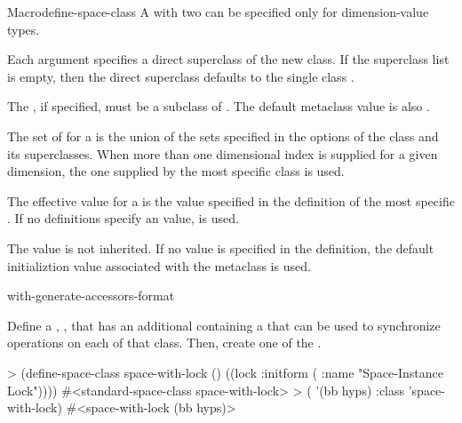 \documentclass[10pt,twoside,english,pdftex]{article}
\begin{document}
\begin{functiondoc}{Macro}{define-space-class}
\fndescription A  with two
 can be specified only for 
dimension-value types.

%
Each  argument specifies a direct superclass of the new
class. If the superclass list is empty, then the direct superclass defaults to the
single class \textbf{}.

%
The  , if specified, must be a subclass of
\textbf{}.  The default metaclass value is
also \textbf{}.


%
%
%
The set of  for a  is the
union of the sets specified in the  options
of the class and its superclasses.  When more than one dimensional
index is supplied for a given dimension, the one supplied by the most
specific class is used.

The effective  value for a
 is the value specified in the definition of the
most specific . If no definitions specify an
 value, \nil{} is used.

The  value is not inherited.  If
no value is specified in the  definition, the
default initializtion value associated with the metaclass is used.

\begin{alsos}{with-generate-accessors-format}
\end{alsos}

\fnexample 
{}%
Define a ,
, that has an additional 
containing a  that can be used to synchronize
operations on each  of that class. Then, create
one  of the 
.
\begin{example}
> (define-space-class space-with-lock ()
    ((lock :initform ( :name "Space-Instance Lock"))))
#<standard-space-class space-with-lock>
> ( '(bb hyps) 
    :class 'space-with-lock)
#<space-with-lock (bb hyps)>
\end{example}

\end{functiondoc}
\end{document}
